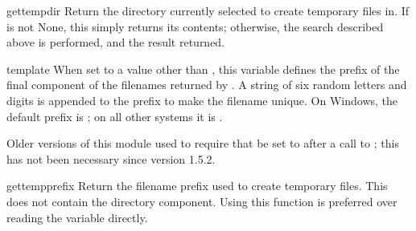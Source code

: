\begin{funcdesc}{gettempdir}{}
Return the directory currently selected to create temporary files in.
If  is not None, this simply returns its contents;
otherwise, the search described above is performed, and the result
returned.
\end{funcdesc}

\begin{datadesc}{template}
When set to a value other than , this variable defines the
prefix of the final component of the filenames returned by
.  A string of six random letters and digits is
appended to the prefix to make the filename unique.  On Windows,
the default prefix is ; on all other systems
it is .

Older versions of this module used to require that  be
set to  after a call to ; this has not
been necessary since version 1.5.2.
\end{datadesc}

\begin{funcdesc}{gettempprefix}{}
Return the filename prefix used to create temporary files.  This does
not contain the directory component.  Using this function is preferred
over reading the  variable directly.
\end{funcdesc}
